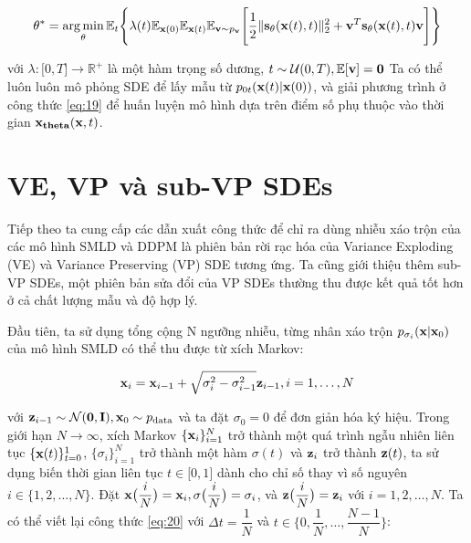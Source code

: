 \documentclass{article} %
\begin{document}
\begin{equation} \label{eq:19}
    \bold{\theta}^{\ast} = \operatorname*{arg\,min}_{\bold{\theta}} \mathbb{E}_t \Bigg \lbrace \lambda (t) \mathbb{E}_{\bold{x}(0)} \mathbb{E}_{\bold{x}(t)} \mathbb{E}_{\bold{v} \sim p_{\bold{v}}} \Bigg \lbrack \dfrac{1}{2} \lVert \bold{s}_{\bold{\theta}} (\bold{x}(t), t) \rVert_2^2 + \bold{v}^T \bold{s}_{\bold{\theta}} (\bold{x}(t), t) \bold{v} \Bigg \rbrack \Bigg \rbrace
\end{equation}

với $\lambda: \lbrack 0, T \rbrack \rightarrow \mathbb{R}^{+}$ là một hàm trọng số dương, $t \sim \mathcal{U}(0, T), \mathbb{E} \lbrack \bold{v} \rbrack = \bold{0}$
Ta có thể luôn luôn mô phỏng SDE để lấy mẫu từ $p_{0t}(\bold{x}(t) \vert \bold{x}(0))$, và giải phương trình ở công thức \ref{eq:19} để huấn luyện mô hình dựa trên điểm số phụ thuộc vào thời gian $\bold{x}_{\bold{theta}}(\bold{x}, t)$.

\section{VE, VP và sub-VP SDEs}

Tiếp theo ta cung cấp các dẫn xuất công thức để chỉ ra dùng nhiễu xáo trộn của các mô hình SMLD và DDPM là phiên bản rời rạc hóa của Variance Exploding (VE) và Variance Preserving (VP) SDE tương ứng.
Ta cũng giới thiệu thêm sub-VP SDEs, một phiên bản sửa đổi của VP SDEs thường thu được kết quả tốt hơn ở cả chất lượng mẫu và độ hợp lý.

Đầu tiên, ta sử dụng tổng cộng N ngưỡng nhiễu, từng nhân xáo trộn $p_{\sigma_i} (\bold{x} \vert \bold{x}_0)$ của mô hình SMLD có thể thu được từ xích Markov:

\begin{equation} \label{eq:20}
    \bold{x}_i = \bold{x}_{i-1} + \sqrt{\sigma_i^2 - \sigma_{i-1}^2} \bold{z}_{i-1}, i = 1, \dots, N
\end{equation}

với $\bold{z}_{i-1} \sim \mathcal{N}(\bold{0}, \bold{I}), \bold{x}_0 \sim p_{\mathrm{data}}$ và ta đặt $\sigma_0 = 0$ để đơn giản hóa ký hiệu.
Trong giới hạn $N \rightarrow \infty$, xích Markov $\lbrace \bold{x}_i \rbrace_{i=1}^N$ trở thành một quá trình ngẫu nhiên liên tục $\lbrace \bold{x}(t) \rbrace_{t=0}^1$,
$\lbrace \sigma_i \rbrace_{i=1}^N$ trở thành một hàm $\sigma(t)$ và $\bold{z}_i$ trở thành $\bold{z}(t)$, ta sử dụng biến thời gian liên tục $t \in \lbrack 0, 1 \rbrack$ dành cho chỉ số thay vì số nguyên $i \in \lbrace 1, 2, \dots, N \rbrace$.
Đặt $\bold{x} \big ( \dfrac{i}{N} \big)=\bold{x}_i, \sigma \big( \dfrac{i}{N} \big) = \sigma_i$,
và $\bold{z} \big ( \dfrac{i}{N} \big)=\bold{z}_i$ với $i = 1, 2, \dots, N$.
Ta có thể viết lại công thức \ref{eq:20} với $\Delta t = \dfrac{1}{N}$ và $t \in \lbrace 0, \dfrac{1}{N}, \dots, \dfrac{N-1}{N} \rbrace$:
\end{document}
